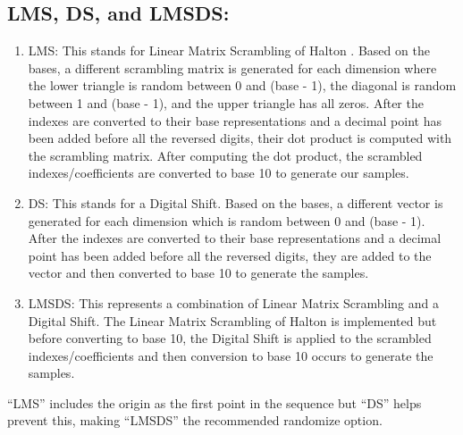\subsection*{LMS, DS, and LMS\textunderscore DS:}
\begin{enumerate}
    \item LMS: This stands for Linear Matrix Scrambling of Halton \cite{owen2023gain}. Based on the bases, a different scrambling matrix is generated for each dimension where the lower triangle is random between 0 and (base - 1), the diagonal is random between 1 and (base - 1), and the upper triangle has all zeros. After the indexes are converted to their base representations and a decimal point has been added before all the reversed digits, their dot product is computed with the scrambling matrix. After computing the dot product, the scrambled indexes/coefficients are converted to base 10 to generate our samples.
    \item DS: This stands for a Digital Shift. Based on the bases, a different vector is generated for each dimension which is random between 0 and (base - 1). After the indexes are converted to their base representations and a decimal point has been added before all the reversed digits, they are added to the vector and then converted to base 10 to generate the samples.
    \item LMS\textunderscore DS: This represents a combination of Linear Matrix Scrambling and a Digital Shift. The Linear Matrix Scrambling of Halton is implemented but before converting to base 10, the Digital Shift is applied to the scrambled indexes/coefficients and then conversion to base 10 occurs to generate the samples.
    \end{enumerate}
 ``LMS'' includes the origin as the first point in the sequence but ``DS'' helps prevent this, making ``LMS\textunderscore DS'' the recommended randomize option.

